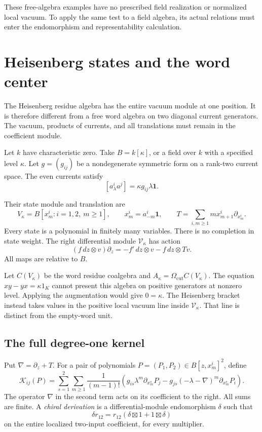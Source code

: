 These free-algebra examples have
no prescribed field realization
or normalized local vacuum.
To apply the same test to a
field algebra, its actual
relations must enter the
endomorphism and representability
calculation.

\section{Heisenberg states and the word center}
\label{v4-arith:centers:sec:heisenberg}

The Heisenberg residue algebra has the entire
vacuum module at one position. It is therefore
different from a free word algebra on two
diagonal current generators. The vacuum,
products of currents, and all translations
must remain in the coefficient module.

Let $k$ have characteristic zero. Take
$B=k[\kappa]$, or a field over $k$ with
a specified level $\kappa$. Let $g=(g_{ij})$
be a nondegenerate symmetric form on a
rank-two current space. The even currents
satisfy
\[
 [a^i_\lambda a^j]=\kappa g_{ij}\lambda\mathbf1.
\]

Their state module and translation are
\[
 V_\kappa=B[x^i_m:i=1,2,\ m\geq1],\qquad
 x^i_m=a^i_{-m}\mathbf1,\qquad
 T=\sum_{i,m\geq1}m x^i_{m+1}\partial_{x^i_m}.
\]
Every state is a polynomial in finitely
many variables. There is no completion
in state weight. The right differential
module $\mathscr V_\kappa$ has action
\[
 (f\,dz\otimes v)\partial_z
 =-f'\,dz\otimes v-f\,dz\otimes Tv.
\]
All maps are relative to $B$.

Let $C(V_\kappa)$ be the word residue
coalgebra and
$A_\kappa=\Omega_{\mathrm{cut}}C(V_\kappa)$.
The equation $xy-yx=\kappa1_K$ cannot
present this algebra on positive
generators at nonzero level. Applying
the augmentation would give $0=\kappa$.
The Heisenberg bracket instead takes
values in the positive local vacuum
line inside $\mathscr V_\kappa$.
That line is distinct from the
empty-word unit.

\subsection{The full degree-one kernel}
\label{v4-arith:centers:subsec:derivations}

Put $\nabla=\partial_z+T$. For a
pair of polynomials
$P=(P_1,P_2)\in B[z,x^i_m]^2$, define
\begin{equation}\label{v4-arith:centers:eq:heis-kernel}
 \mathcal K_{ij}(P)=
 \sum_{s=1}^2\sum_{m\geq1}\frac1{(m-1)!}
 \left(
 g_{is}\lambda^m\partial_{x^s_m}P_j
 -g_{js}(-\lambda-\nabla)^m\partial_{x^s_m}P_i
 \right).
\end{equation}
The operator $\nabla$ in the second
term acts on its coefficient to the
right. All sums are finite.
A \emph{chiral derivation} is a
differential-module endomorphism
$\delta$ such that
\[
 \delta r_{12}
 =r_{12}(\delta\boxtimes1+1\boxtimes\delta)
\]
on the entire localized two-input
coefficient, for every multiplier.

